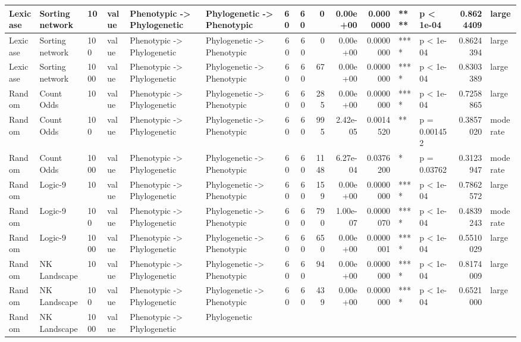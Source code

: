 \documentclass[]{book}
\begin{document}
\begin{table}
\begin{tabular}[t]{l|l|l|l|l|l|r|r|r|r|r|l|l|r|l}
\hline
Lexicase & Sorting network & 10 & value & Phenotypic
    ->
Phylogenetic & Phylogenetic
    ->
Phenotypic & 60 & 60 & 0 & 0.00e+00 & 0.0000000 & **** & p < 1e-04 & 0.8624409 & large\\
\hline
Lexicase & Sorting network & 100 & value & Phenotypic
    ->
Phylogenetic & Phylogenetic
    ->
Phenotypic & 60 & 60 & 0 & 0.00e+00 & 0.0000000 & **** & p < 1e-04 & 0.8624394 & large\\
\hline
Lexicase & Sorting network & 1000 & value & Phenotypic
    ->
Phylogenetic & Phylogenetic
    ->
Phenotypic & 60 & 60 & 67 & 0.00e+00 & 0.0000000 & **** & p < 1e-04 & 0.8303389 & large\\
\hline
Random & Count Odds & 10 & value & Phenotypic
    ->
Phylogenetic & Phylogenetic
    ->
Phenotypic & 60 & 60 & 285 & 0.00e+00 & 0.0000000 & **** & p < 1e-04 & 0.7258865 & large\\
\hline
Random & Count Odds & 100 & value & Phenotypic
    ->
Phylogenetic & Phylogenetic
    ->
Phenotypic & 60 & 60 & 995 & 2.42e-05 & 0.0014520 & ** & p = 0.001452 & 0.3857020 & moderate\\
\hline
Random & Count Odds & 1000 & value & Phenotypic
    ->
Phylogenetic & Phylogenetic
    ->
Phenotypic & 60 & 60 & 1148 & 6.27e-04 & 0.0376200 & * & p = 0.03762 & 0.3123947 & moderate\\
\hline
Random & Logic-9 & 10 & value & Phenotypic
    ->
Phylogenetic & Phylogenetic
    ->
Phenotypic & 60 & 60 & 159 & 0.00e+00 & 0.0000000 & **** & p < 1e-04 & 0.7862572 & large\\
\hline
Random & Logic-9 & 100 & value & Phenotypic
    ->
Phylogenetic & Phylogenetic
    ->
Phenotypic & 60 & 60 & 790 & 1.00e-07 & 0.0000070 & **** & p < 1e-04 & 0.4839243 & moderate\\
\hline
Random & Logic-9 & 1000 & value & Phenotypic
    ->
Phylogenetic & Phylogenetic
    ->
Phenotypic & 60 & 60 & 650 & 0.00e+00 & 0.0000001 & **** & p < 1e-04 & 0.5510029 & large\\
\hline
Random & NK Landscape & 10 & value & Phenotypic
    ->
Phylogenetic & Phylogenetic
    ->
Phenotypic & 60 & 60 & 94 & 0.00e+00 & 0.0000000 & **** & p < 1e-04 & 0.8174009 & large\\
\hline
Random & NK Landscape & 100 & value & Phenotypic
    ->
Phylogenetic & Phylogenetic
    ->
Phenotypic & 60 & 60 & 439 & 0.00e+00 & 0.0000000 & **** & p < 1e-04 & 0.6521000 & large\\
\hline
Random & NK Landscape & 1000 & value & Phenotypic
    ->
Phylogenetic & Phylogenetic

\end{tabular}
\end{table}
\end{document}
